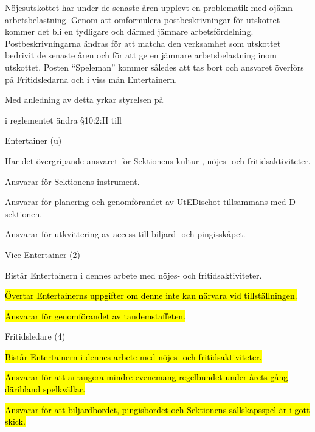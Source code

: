 \documentclass[../_main/handlingar.tex]{subfiles}
\begin{document}
Nöjesutskottet har under de senaste åren upplevt en problematik med ojämn arbetsbelastning. Genom att omformulera postbeskrivningar för utskottet kommer det bli en tydligare och därmed jämnare arbetsfördelning. Postbeskrivningarna ändras för att matcha den verksamhet som utskottet bedrivit de senaste åren och för att ge en jämnare arbetsbelastning inom utskottet. Posten “Speleman” kommer således att tas bort och ansvaret överförs på Fritidsledarna och i viss mån Entertainern.

Med anledning av detta yrkar styrelsen på
\begin{attsatser}
    \att i reglementet ändra \S10:2:H till\par
      Entertainer (u)
        \begin{tightdashlist}
            \item Har det övergripande ansvaret för Sektionens kultur-, nöjes- och fritidsaktiviteter.
            \item Ansvarar för Sektionens instrument.
            \item Ansvarar för planering och genomförandet av UtEDischot tillsammans med D-sektionen.
            \item Ansvarar för utkvittering av access till biljard- och pingisskåpet.
        \end{tightdashlist}

      Vice Entertainer (2)
          \begin{tightdashlist}
              \item Bistår Entertainern i dennes arbete med nöjes- och fritidsaktiviteter.
              \item \hl{Övertar Entertainerns uppgifter om denne inte kan närvara vid tillställningen.}
              \item \hl{Ansvarar för genomförandet av tandemstaffeten.}
          \end{tightdashlist}

      Fritidsledare (4)
          \begin{tightdashlist}
              \item \hl{Bistår Entertainern i dennes arbete med nöjes- och fritidsaktiviteter.}
              \item \hl{Ansvarar för att arrangera mindre evenemang regelbundet under årets gång däribland spelkvällar.}
              \item \hl{Ansvarar för att biljardbordet, pingisbordet och Sektionens sällskapsspel är i gott skick.}
          \end{tightdashlist}


\end{attsatser}
\end{document}
